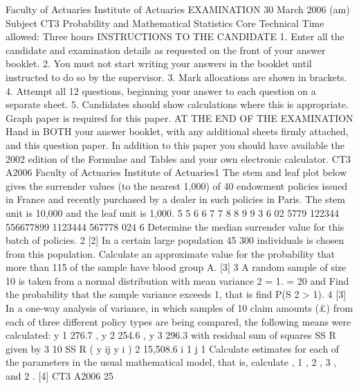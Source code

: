 \documentclass[a4paper,12pt]{article}
\begin{document}
\begin{enumerate}

Faculty of Actuaries
Institute of Actuaries
EXAMINATION
30 March 2006 (am)
Subject CT3
Probability and Mathematical Statistics
Core Technical
Time allowed: Three hours
INSTRUCTIONS TO THE CANDIDATE
1. Enter all the candidate and examination details as requested on the front of your answer
booklet.
2. You must not start writing your answers in the booklet until instructed to do so by the
supervisor.
3. Mark allocations are shown in brackets.
4. Attempt all 12 questions, beginning your answer to each question on a separate sheet.
5. Candidates should show calculations where this is appropriate.
Graph paper is required for this paper.
AT THE END OF THE EXAMINATION
Hand in BOTH your answer booklet, with any additional sheets firmly attached, and this
question paper.
In addition to this paper you should have available the 2002 edition of the
Formulae and Tables and your own electronic calculator.
CT3 A2006
Faculty of Actuaries
Institute of Actuaries1
The stem and leaf plot below gives the surrender values (to the nearest 1,000) of 40
endowment policies issued in France and recently purchased by a dealer in such
policies in Paris. The stem unit is 10,000 and the leaf unit is 1,000.
5
5
6
6
7
7
8
8
9
9
3
6
02
5779
122344
556677899
1123444
567778
024
6
Determine the median surrender value for this batch of policies.
2
[2]
In a certain large population 45%
300 individuals is chosen from this population.
Calculate an approximate value for the probability that more than 115 of the sample
have blood group A.
[3]
3
A random sample of size 10 is taken from a normal distribution with mean
variance 2 = 1.
= 20 and
Find the probability that the sample variance exceeds 1, that is find P(S 2 > 1).
4
[3]
In a one-way analysis of variance, in which samples of 10 claim amounts (£) from
each of three different policy types are being compared, the following means were
calculated:
y 1
276.7 ,
y 2
254.6 ,
y 3
296.3
with residual sum of squares SS R given by
3 10
SS R
( y ij
y i ) 2 15,508.6
i 1 j 1
Calculate estimates for each of the parameters in the usual mathematical model, that
is, calculate , 1 , 2 , 3 , and 2 .
[4]
CT3 A2006 25


\end{enumerate}
\end{document}
